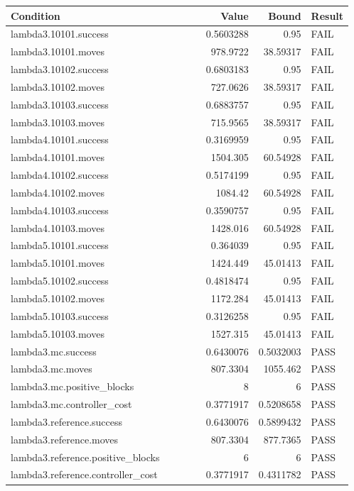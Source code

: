 \documentclass[10pt]{article}
\begin{document}
{\small\begin{longtable}{p{0.58\linewidth}rrl}\toprule Condition & Value & Bound & Result \\ \midrule\endhead\par
lambda3.10101.success & 0.5603288 & 0.95 & FAIL \\
lambda3.10101.moves & 978.9722 & 38.59317 & FAIL \\
lambda3.10102.success & 0.6803183 & 0.95 & FAIL \\
lambda3.10102.moves & 727.0626 & 38.59317 & FAIL \\
lambda3.10103.success & 0.6883757 & 0.95 & FAIL \\
lambda3.10103.moves & 715.9565 & 38.59317 & FAIL \\
lambda4.10101.success & 0.3169959 & 0.95 & FAIL \\
lambda4.10101.moves & 1504.305 & 60.54928 & FAIL \\
lambda4.10102.success & 0.5174199 & 0.95 & FAIL \\
lambda4.10102.moves & 1084.42 & 60.54928 & FAIL \\
lambda4.10103.success & 0.3590757 & 0.95 & FAIL \\
lambda4.10103.moves & 1428.016 & 60.54928 & FAIL \\
lambda5.10101.success & 0.364039 & 0.95 & FAIL \\
lambda5.10101.moves & 1424.449 & 45.01413 & FAIL \\
lambda5.10102.success & 0.4818474 & 0.95 & FAIL \\
lambda5.10102.moves & 1172.284 & 45.01413 & FAIL \\
lambda5.10103.success & 0.3126258 & 0.95 & FAIL \\
lambda5.10103.moves & 1527.315 & 45.01413 & FAIL \\
lambda3.mc.success & 0.6430076 & 0.5032003 & PASS \\
lambda3.mc.moves & 807.3304 & 1055.462 & PASS \\
lambda3.mc.positive\_blocks & 8 & 6 & PASS \\
lambda3.mc.controller\_cost & 0.3771917 & 0.5208658 & PASS \\
lambda3.reference.success & 0.6430076 & 0.5899432 & PASS \\
lambda3.reference.moves & 807.3304 & 877.7365 & PASS \\
lambda3.reference.positive\_blocks & 6 & 6 & PASS \\
lambda3.reference.controller\_cost & 0.3771917 & 0.4311782 & PASS \\

\end{longtable}}
\end{document}
